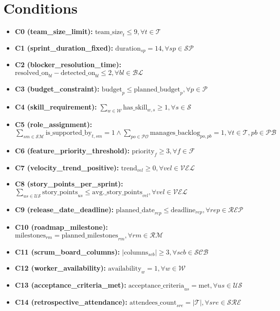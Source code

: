 \documentclass{article}
\begin{document}
\section{Conditions}
\begin{itemize}
    \item \textbf{C0 (team\_size\_limit):} $\text{team\_size}_t \leq 9, \forall t \in \mathcal{T}$
    \item \textbf{C1 (sprint\_duration\_fixed):} $\text{duration}_{sp} = 14, \forall sp \in \mathcal{SP}$
    \item \textbf{C2 (blocker\_resolution\_time):} $\text{resolved\_on}_{bl} - \text{detected\_on}_{bl} \leq 2, \forall bl \in \mathcal{BL}$
    \item \textbf{C3 (budget\_constraint):} $\text{budget}_p \leq \text{planned\_budget}_p, \forall p \in \mathcal{P}$
    \item \textbf{C4 (skill\_requirement):} $\sum_{w \in \mathcal{W}} \text{has\_skill}_{w,s} \geq 1, \forall s \in \mathcal{S}$
    \item \textbf{C5 (role\_assignment):} $\sum_{sm \in \mathcal{SM}} \text{is\_supported\_by}_{t,sm} = 1 \land \sum_{po \in \mathcal{PO}} \text{manages\_backlog}_{po,pb} = 1, \forall t \in \mathcal{T}, pb \in \mathcal{PB}$
    \item \textbf{C6 (feature\_priority\_threshold):} $\text{priority}_f \geq 3, \forall f \in \mathcal{F}$
    \item \textbf{C7 (velocity\_trend\_positive):} $\text{trend}_{vel} \geq 0, \forall vel \in \mathcal{VEL}$
    \item \textbf{C8 (story\_points\_per\_sprint):} $\sum_{us \in \mathcal{US}} \text{story\_points}_{us} \leq \text{avg.\_story\_points}_{vel}, \forall vel \in \mathcal{VEL}$
    \item \textbf{C9 (release\_date\_deadline):} $\text{planned\_date}_{rep} \leq \text{deadline}_{rep}, \forall rep \in \mathcal{REP}$
    \item \textbf{C10 (roadmap\_milestone):} $\text{milestones}_{rm} = \text{planned\_milestones}_{rm}, \forall rm \in \mathcal{RM}$
    \item \textbf{C11 (scrum\_board\_columns):} $|\text{columns}_{scb}| \geq 3, \forall scb \in \mathcal{SCB}$
    \item \textbf{C12 (worker\_availability):} $\text{availability}_w = 1, \forall w \in \mathcal{W}$
    \item \textbf{C13 (acceptance\_criteria\_met):} $\text{acceptance\_criteria}_{us} = \text{met}, \forall us \in \mathcal{US}$
    \item \textbf{C14 (retrospective\_attendance):} $\text{attendees\_count}_{sre} = |\mathcal{T}|, \forall sre \in \mathcal{SRE}$
\end{itemize}
\end{document}
